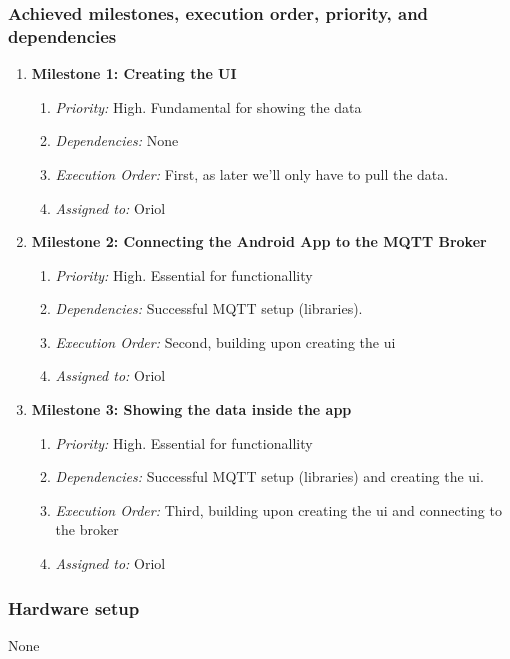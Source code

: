 \subsubsection{Achieved milestones, execution order, priority, and dependencies}
\begin{enumerate}
    \item \textbf{Milestone 1: Creating the UI}
        \begin{enumerate}
            \item \textit{Priority:} High. Fundamental for showing the data
            \item \textit{Dependencies:} None
            \item \textit{Execution Order:} First, as later we'll only have to pull the data.
            \item \textit{Assigned to:} Oriol
        \end{enumerate}

    \item \textbf{Milestone 2: Connecting the Android App to the MQTT Broker}
        \begin{enumerate}
            \item \textit{Priority:} High. Essential for functionallity
            \item \textit{Dependencies:} Successful MQTT setup (libraries).
            \item \textit{Execution Order:} Second, building upon creating the ui
            \item \textit{Assigned to:} Oriol
        \end{enumerate}

    \item \textbf{Milestone 3: Showing the data inside the app}
        \begin{enumerate}
            \item \textit{Priority:} High. Essential for functionallity
            \item \textit{Dependencies:} Successful MQTT setup (libraries) and creating the ui.
            \item \textit{Execution Order:} Third, building upon creating the ui and connecting to the broker
            \item \textit{Assigned to:} Oriol
        \end{enumerate}
\end{enumerate}

\subsubsection{Hardware setup}
None

